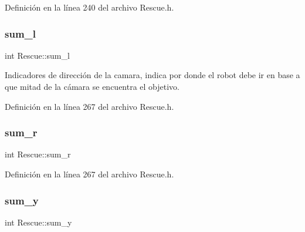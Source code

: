 Definición en la línea 240 del archivo Rescue.\+h.

\mbox{\label{classRescue_a92ae48ef6c0bb371cb0ea9c6eb4a8a87_a92ae48ef6c0bb371cb0ea9c6eb4a8a87}} 
\subsubsection{\texorpdfstring{sum\+\_\+l}{sum\_l}}
{\footnotesize\ttfamily int Rescue\+::sum\+\_\+l\hspace{0.3cm}{\ttfamily [private]}}



Indicadores de dirección de la camara, indica por donde el robot debe ir en base a que mitad de la cámara se encuentra el objetivo. 



Definición en la línea 267 del archivo Rescue.\+h.

\mbox{\label{classRescue_af84f4ef8ca1595be05ebcd5907f06c25_af84f4ef8ca1595be05ebcd5907f06c25}} 
\subsubsection{\texorpdfstring{sum\+\_\+r}{sum\_r}}
{\footnotesize\ttfamily int Rescue\+::sum\+\_\+r\hspace{0.3cm}{\ttfamily [private]}}



Definición en la línea 267 del archivo Rescue.\+h.

\mbox{\label{classRescue_a9a95f0cd95b72a89f87c6e9b19d71f73_a9a95f0cd95b72a89f87c6e9b19d71f73}} 
\subsubsection{\texorpdfstring{sum\+\_\+y}{sum\_y}}
{\footnotesize\ttfamily int Rescue\+::sum\+\_\+y\hspace{0.3cm}{\ttfamily [private]}}



